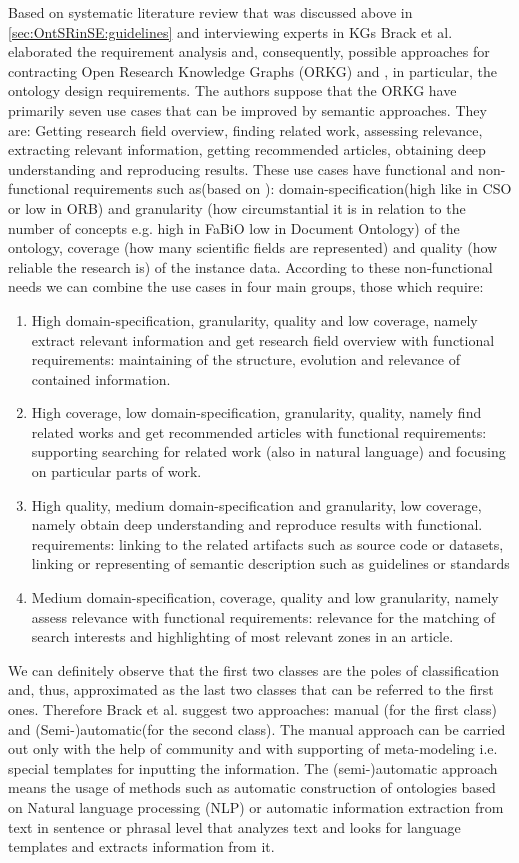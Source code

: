 		Based on systematic literature review\cite{Kit07} that was discussed above in \autoref{sec:OntSRinSE:guidelines} and interviewing experts in KGs Brack et al. \cite{Bra20} elaborated the requirement analysis and, consequently, possible approaches for contracting Open Research Knowledge Graphs (ORKG) and , in particular, the ontology design requirements. The authors suppose that the ORKG have primarily seven use cases that can be improved by semantic approaches. They are: Getting research field overview, finding related work, assessing relevance, extracting relevant information, getting recommended articles,  obtaining deep understanding and reproducing results. These use cases have functional and non-functional requirements such as(based on \cite{Bra20}): domain-specification(high like in CSO or low in ORB) and granularity (how circumstantial it is in relation to the number of concepts e.g. high in FaBiO low in Document Ontology) of the ontology, coverage (how many scientific fields are represented) and quality (how reliable the research is) of the instance data. According to these non-functional needs we can combine the use cases in four main groups, those which require: 
			\begin{enumerate}
				\item High domain-specification, granularity, quality and low coverage, namely extract relevant information and get research field overview with functional requirements: maintaining of the structure, evolution and relevance of contained information.  
				\item High coverage, low domain-specification, granularity, quality, namely find related works and get recommended articles with functional requirements: supporting searching for related work (also in natural language) and focusing on particular parts of work. 
				\item High quality, medium domain-specification and granularity, low coverage, namely obtain deep understanding and reproduce results with functional. requirements: linking to the related artifacts such as source code or datasets, linking or representing of semantic description such as guidelines or standards
				\item Medium domain-specification, coverage, quality and low granularity, namely assess relevance with functional requirements: relevance for the matching of search interests and highlighting of most relevant zones in an article. 
			\end{enumerate} 
		We can definitely observe that the first two classes are the poles of classification and, thus, approximated as the last two classes that can be referred to the first ones. Therefore Brack et al. \cite{Bra20} suggest two approaches: manual (for the first class) and (Semi-)automatic(for the second class). The manual approach can be carried out only with the help of community and with supporting of meta-modeling i.e. special templates for inputting the information. The (semi-)automatic approach means the usage of methods such as automatic construction of ontologies based on Natural language processing (NLP) or automatic information extraction from text in sentence or phrasal level that analyzes text and looks for language templates and extracts information from it.
		

